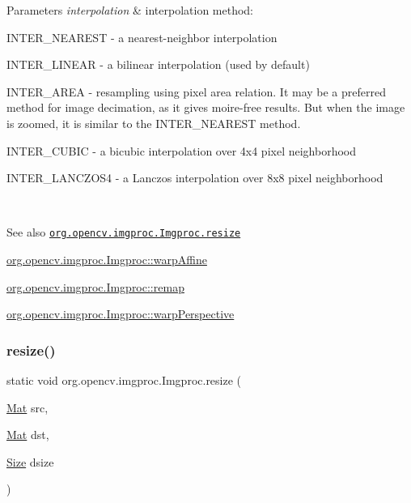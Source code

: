 \begin{DoxyParams}{Parameters}
{\em interpolation} & interpolation method\+: 
\begin{DoxyItemize}
\item I\+N\+T\+E\+R\+\_\+\+N\+E\+A\+R\+E\+ST -\/ a nearest-\/neighbor interpolation 
\item I\+N\+T\+E\+R\+\_\+\+L\+I\+N\+E\+AR -\/ a bilinear interpolation (used by default) 
\item I\+N\+T\+E\+R\+\_\+\+A\+R\+EA -\/ resampling using pixel area relation. It may be a preferred method for image decimation, as it gives moire\textquotesingle{}-\/free results. But when the image is zoomed, it is similar to the {\ttfamily I\+N\+T\+E\+R\+\_\+\+N\+E\+A\+R\+E\+ST} method. 
\item I\+N\+T\+E\+R\+\_\+\+C\+U\+B\+IC -\/ a bicubic interpolation over 4x4 pixel neighborhood 
\item I\+N\+T\+E\+R\+\_\+\+L\+A\+N\+C\+Z\+O\+S4 -\/ a Lanczos interpolation over 8x8 pixel neighborhood 
\end{DoxyItemize}\\
\hline
\end{DoxyParams}
\begin{DoxySeeAlso}{See also}
\href{http://docs.opencv.org/modules/imgproc/doc/geometric_transformations.html#resize}{\tt org.\+opencv.\+imgproc.\+Imgproc.\+resize} 

\mbox{\hyperlink{classorg_1_1opencv_1_1imgproc_1_1_imgproc_a139ccfb9b241fc867096f4c850088058}{org.\+opencv.\+imgproc.\+Imgproc\+::warp\+Affine}} 

\mbox{\hyperlink{classorg_1_1opencv_1_1imgproc_1_1_imgproc_a8a8e3511105ae0f5fbd525e31ad7672c}{org.\+opencv.\+imgproc.\+Imgproc\+::remap}} 

\mbox{\hyperlink{classorg_1_1opencv_1_1imgproc_1_1_imgproc_aad167fa9fe0009a54f7732488102938c}{org.\+opencv.\+imgproc.\+Imgproc\+::warp\+Perspective}} 
\end{DoxySeeAlso}
\mbox{\label{classorg_1_1opencv_1_1imgproc_1_1_imgproc_ae2819900a62b48a2d701f0c5ead64922}} 
\subsubsection{\texorpdfstring{resize()}{resize()}\hspace{0.1cm}{\footnotesize\ttfamily [2/2]}}
{\footnotesize\ttfamily static void org.\+opencv.\+imgproc.\+Imgproc.\+resize (\begin{DoxyParamCaption}\item[{\mbox{\hyperlink{classorg_1_1opencv_1_1core_1_1_mat}{Mat}}}]{src,  }\item[{\mbox{\hyperlink{classorg_1_1opencv_1_1core_1_1_mat}{Mat}}}]{dst,  }\item[{\mbox{\hyperlink{classorg_1_1opencv_1_1core_1_1_size}{Size}}}]{dsize }\end{DoxyParamCaption})\hspace{0.3cm}{\ttfamily [static]}}

